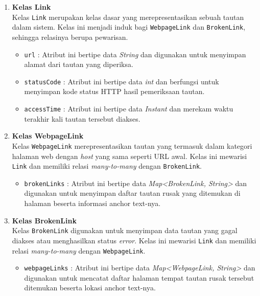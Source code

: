 \begin{enumerate}
    \item \textbf{Kelas Link}\\  
    Kelas \texttt{Link} merupakan kelas dasar yang merepresentasikan sebuah tautan dalam sistem. Kelas ini menjadi induk bagi \texttt{WebpageLink} dan \texttt{BrokenLink}, sehingga relasinya berupa pewarisan.
    \begin{itemize}
        \item \texttt{url} : Atribut ini bertipe data \textit{String} dan digunakan untuk menyimpan alamat dari tautan yang diperiksa.
        \item \texttt{statusCode} : Atribut ini bertipe data \textit{int} dan berfungsi untuk menyimpan kode status HTTP hasil pemeriksaan tautan.
        \item \texttt{accessTime} : Atribut ini bertipe data \textit{Instant} dan merekam waktu terakhir kali tautan tersebut diakses.
    \end{itemize}

    \item \textbf{Kelas WebpageLink}\\
    Kelas \texttt{WebpageLink} merepresentasikan tautan yang termasuk dalam kategori halaman web dengan \textit{host} yang sama seperti URL awal. Kelas ini mewarisi \texttt{Link} dan memiliki relasi \textit{many-to-many} dengan \texttt{BrokenLink}.
    \begin{itemize}
        \item \texttt{brokenLinks} : Atribut ini bertipe data \textit{Map<BrokenLink, String>} dan digunakan untuk menyimpan daftar tautan rusak yang ditemukan di halaman beserta informasi anchor text-nya.
    \end{itemize}

    \item \textbf{Kelas BrokenLink}\\
    Kelas \texttt{BrokenLink} digunakan untuk menyimpan data tautan yang gagal diakses atau menghasilkan status \textit{error}. Kelas ini mewarisi \texttt{Link} dan memiliki relasi \textit{many-to-many} dengan \texttt{WebpageLink}.
    \begin{itemize}
        \item \texttt{webpageLinks} : Atribut ini bertipe data \textit{Map<WebpageLink, String>} dan digunakan untuk mencatat daftar halaman tempat tautan rusak tersebut ditemukan beserta lokasi anchor text-nya.
    \end{itemize}


\end{enumerate}
